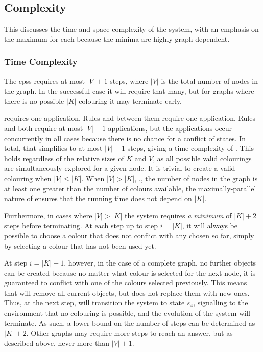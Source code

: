 \subsection{\label{sec:gcol:complexity}Complexity}
This  discusses the time and space complexity of the system, with an emphasis on the maximum for each because the minima are highly graph-dependent.

\subsubsection{Time Complexity}
The \glspl{cps} requires at most \(|V| + 1\) steps, where \(|V|\) is the total number of nodes in the graph.  In the successful case it will require that many, but for graphs where there is no possible \(|K|\)-colouring it may terminate early.

 requires one application.  Rules  and  between them require one application.  Rules  and  both require at most \(|V| - 1\) applications, but the applications occur concurrently in all cases because there is no chance for a conflict of states.  In total, that simplifies to at most \(|V| + 1\) steps, giving a time complexity of .  This holds regardless of the relative sizes of \(K\) and \(V\), as all possible valid colourings are simultaneously explored for a given node.  It is trivial to create a valid colouring when \(|V| \leq |K|\).   When \(|V| > |K|\), \ie{}., the number of nodes in the graph is at least one greater than the number of colours available, the maximally-parallel nature of  ensures that the running time does not depend on \(|K|\).

Furthermore, in cases where \(|V| > |K|\) the system requires \emph{a minimum} of \(|K| + 2\) steps before terminating.  At each step up to step \(i = |K|\), it will always be possible to choose a colour that does not conflict with any chosen so far, simply by selecting a colour that has not been used yet.  

At step \(i = |K| + 1\), however, in the case of a complete graph, no further \bo{} objects can be created because no matter what colour is selected for the next node, it is guaranteed to conflict with one of the colours selected previously.  This means that  will remove all current \bo{} objects, but  does not replace them with new ones.  Thus, at the next step,  will transition the system to state \(s_4\), signalling to the environment that no colouring is possible, and the evolution of the system will terminate.  As such, a lower bound on the number of steps can be determined as \(|K| + 2\).  Other graphs may require more steps to reach an answer, but as described above, never more than \(|V| + 1\).

